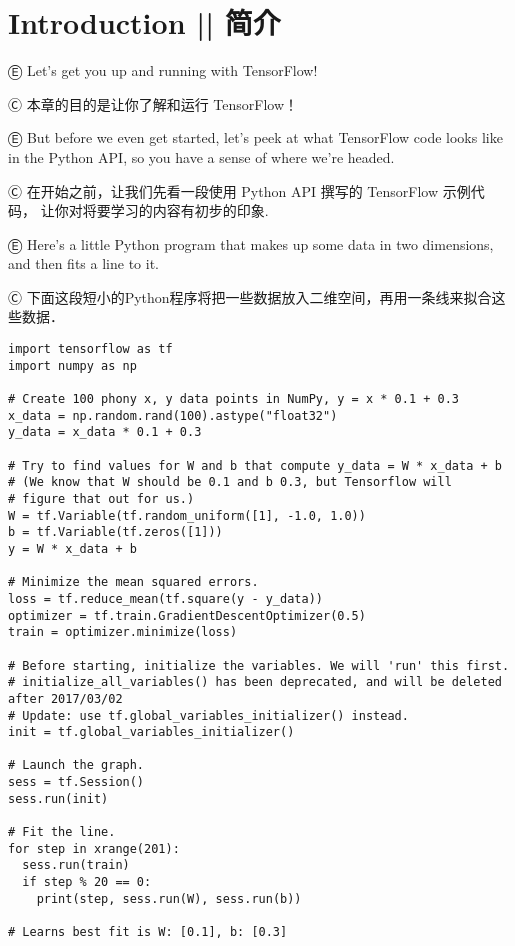 

\section{Introduction  ||  简介}

Ⓔ \textcolor{etc}{Let's get you up and running with TensorFlow!}

Ⓒ 本章的目的是让你了解和运行 TensorFlow！

Ⓔ \textcolor{etc}{But before we even get started, let's peek at what TensorFlow code looks like in the Python API, so you have a sense of where we're headed.}

Ⓒ 在开始之前，让我们先看一段使用 Python API 撰写的 TensorFlow 示例代码，
让你对将要学习的内容有初步的印象.

Ⓔ \textcolor{etc}{Here's a little Python program that makes up some data in two dimensions, and then fits a line to it.}

Ⓒ 下面这段短小的Python程序将把一些数据放入二维空间，再用一条线来拟合这些数据．

\begin{lstlisting}
import tensorflow as tf
import numpy as np

# Create 100 phony x, y data points in NumPy, y = x * 0.1 + 0.3
x_data = np.random.rand(100).astype("float32")
y_data = x_data * 0.1 + 0.3

# Try to find values for W and b that compute y_data = W * x_data + b
# (We know that W should be 0.1 and b 0.3, but Tensorflow will
# figure that out for us.)
W = tf.Variable(tf.random_uniform([1], -1.0, 1.0))
b = tf.Variable(tf.zeros([1]))
y = W * x_data + b

# Minimize the mean squared errors.
loss = tf.reduce_mean(tf.square(y - y_data))
optimizer = tf.train.GradientDescentOptimizer(0.5)
train = optimizer.minimize(loss)

# Before starting, initialize the variables. We will 'run' this first.
# initialize_all_variables() has been deprecated, and will be deleted after 2017/03/02
# Update: use tf.global_variables_initializer() instead. 
init = tf.global_variables_initializer()

# Launch the graph.
sess = tf.Session()
sess.run(init)

# Fit the line.
for step in xrange(201):
  sess.run(train)
  if step % 20 == 0:
    print(step, sess.run(W), sess.run(b))

# Learns best fit is W: [0.1], b: [0.3]
\end{lstlisting}

